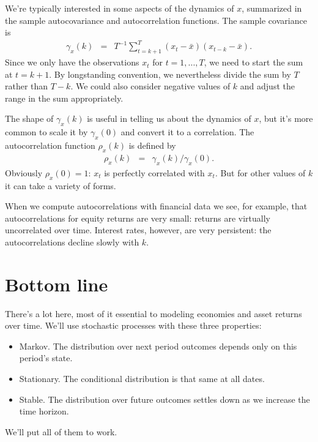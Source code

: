 \documentclass[11pt]{article}
\begin{document}
We're typically interested in some aspects of the dynamics of $x$,
summarized in the sample autocovariance and autocorrelation functions.
The sample covariance is
\begin{eqnarray*}
    \gamma_x(k)  &=&  T^{-1} \sum_{t=k+1}^T (x_{t}-\bar{x})(x_{t-k}-\bar{x}) .
\end{eqnarray*}
Since we only have the observations $x_t$ for $t=1,...,T$,
we need to start the sum at $t=k+1$.
By longstanding convention, we nevertheless divide the sum by $T$ rather than $T-k$.
We could also consider negative values of $k$ and adjust the
range in the sum appropriately.

The shape of $\gamma_x(k)$ is useful in telling us about the dynamics of $x$,
but it's more common to scale it by $\gamma_x(0)$ and convert it to
a correlation.
The autocorrelation function $\rho_x(k)$ is defined by
\begin{eqnarray*}
    \rho_x(k)  &=&  \gamma_x(k)/\gamma_x(0).
\end{eqnarray*}
Obviously $\rho_x(0) = 1$:  $x_t$ is perfectly correlated with $x_t$.
But for other values of $k$ it can take a variety of forms.

When we compute autocorrelations with financial
data we see, for example, that autocorrelations for equity returns are very small:
returns are virtually uncorrelated over time.
Interest rates, however, are very persistent:
the autocorrelations decline slowly with $k$.


%


\section*{Bottom line}

There's a lot here, most of it essential to modeling
economies and asset returns over time.
We'll use stochastic processes with these three properties:
\begin{itemize}
\item Markov. The distribution over next period outcomes depends only
on this period's state.
\item Stationary. The conditional distribution is that same at all dates.
\item Stable. The distribution over future outcomes settles down as we increase
the time horizon.
\end{itemize}
We'll put all of them to work.
\end{document}
